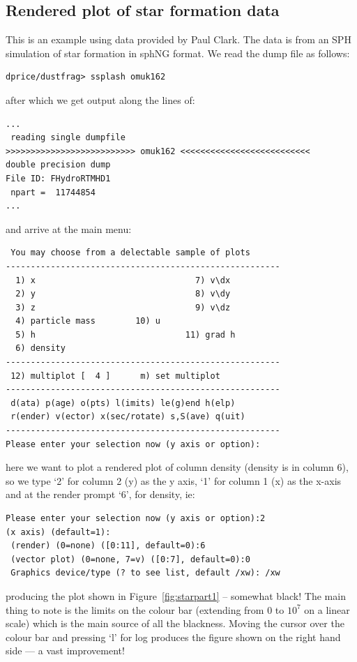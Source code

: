 \documentclass[a4paper,10pt]{article}
\begin{document}
\subsection{Rendered plot of star formation data}
 This is an example using data provided by Paul Clark. The data is from an SPH simulation of star formation in sphNG format. We read the dump file as follows:
\begin{verbatim}
dprice/dustfrag> ssplash omuk162
\end{verbatim}
after which we get output along the lines of:
\begin{verbatim}
...
 reading single dumpfile
>>>>>>>>>>>>>>>>>>>>>>>>>> omuk162 <<<<<<<<<<<<<<<<<<<<<<<<<<
double precision dump
File ID: FHydroRTMHD1
 npart =  11744854
...
\end{verbatim}
and arrive at the main menu:
\begin{verbatim}
 You may choose from a delectable sample of plots 
-------------------------------------------------------
  1) x                                7) v\dx                
  2) y                                8) v\dy                
  3) z                                9) v\dz                
  4) particle mass        10) u                   
  5) h                              11) grad h              
  6) density             
-------------------------------------------------------
 12) multiplot [  4 ]      m) set multiplot 
-------------------------------------------------------
 d(ata) p(age) o(pts) l(imits) le(g)end h(elp)
 r(ender) v(ector) x(sec/rotate) s,S(ave) q(uit)
-------------------------------------------------------
Please enter your selection now (y axis or option):
\end{verbatim}
here we want to plot a rendered plot of column density (density is in column 6), so we type `2' for column 2 (y) as the y axis, `1' for column 1 (x) as the x-axis and at the render prompt `6', for density, ie:
\begin{verbatim}
Please enter your selection now (y axis or option):2
(x axis) (default=1):
 (render) (0=none) ([0:11], default=0):6
 (vector plot) (0=none, 7=v) ([0:7], default=0):0
 Graphics device/type (? to see list, default /xw): /xw
\end{verbatim}
producing the plot shown in Figure~\ref{fig:starpart1} -- somewhat black! The main thing to note is the limits on the colour bar (extending from $0$ to $10^{7}$ on a linear scale) which is the main source of all the blackness. Moving the cursor over the colour bar and pressing `l' for log produces the figure shown on the right hand side --- a vast improvement!
\end{document}
